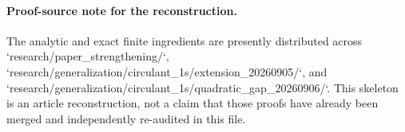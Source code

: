 \documentclass[11pt]{article}
\theoremstyle{remark}
\begin{document}
\paragraph{Proof-source note for the reconstruction.}
The analytic and exact finite ingredients are presently distributed across
`research/paper_strengthening/`,
`research/generalization/circulant_1s/extension_20260905/`, and
`research/generalization/circulant_1s/quadratic_gap_20260906/`.
This skeleton is an article reconstruction, not a claim that those proofs have
already been merged and independently re-audited in this file.
\end{document}
